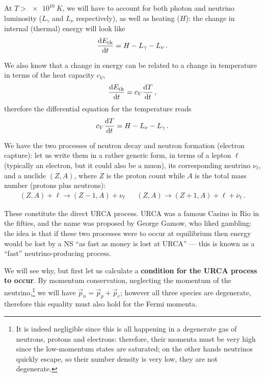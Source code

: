 \documentclass[main.tex]{subfiles}
\begin{document}
At \(T > \SI{e10}{K}\), we will have to account for both photon and neutrino luminosity (\(L_\gamma \) and \(L_\nu \) respectively), as well as heating (\(H\)): the change in internal (thermal) energy will look like
%
\begin{align}
\dv{E _{\text{th}}}{t} = H - L_\gamma - L_\nu 
\,.
\end{align}

We also know that a change in energy can be related to a change in temperature in terms of the heat capacity \(c_V\),
%
\begin{align}
\dv{E _{\text{th}}}{t} = c_V \dv{T }{t}
\,,
\end{align}
%
therefore the differential equation for the temperature reads
%
\begin{align}
c_V \dv{T }{t} = H - L_\nu - L_\gamma 
\,.
\end{align}

We have the two processes of neutron decay and neutron formation (electron capture): let us write them in a rather generic form, in terms of a lepton \(\ell\) (typically an electron, but it could also be a muon), its corresponding neutrino \(\nu _\ell\), and a nuclide \((Z, A)\), where \(Z\) is the proton count while \(A\) is the total mass number (protons plus neutrons):
%
\begin{align}
(Z, A) + \ell \to (Z-1, A) + \nu_\ell
&&
(Z, A) \to (Z+1, A) + \ell + \overline{\nu}_\ell
\,.
\end{align}

These constitute the direct URCA process. 
URCA was a famous Casino in Rio in the fifties, and the name was proposed by George Gamow, who liked gambling: 
the idea is that if these two processes were to occur at equilibrium then energy would be lost by a NS ``as fast as money is lost at URCA'' --- this is known as a ``fast'' neutrino-producing process.

We will see why, but first let us calculate a \textbf{condition for the URCA process to occur}.
By momentum conservation, neglecting the momentum of the neutrino,\footnote{It is indeed negligible since this is all happening in a degenerate gas of neutrons, protons and electrons: therefore, their momenta must be very high since the low-momentum states are saturated; on the other hands neutrinos quickly escape, so their number density is very low, they are not degenerate.} we will have \(\vec{p}_n = \vec{p}_p + \vec{p}_e\); however all three species are degenerate, therefore this equality must also hold for the Fermi momenta. 
\end{document}
